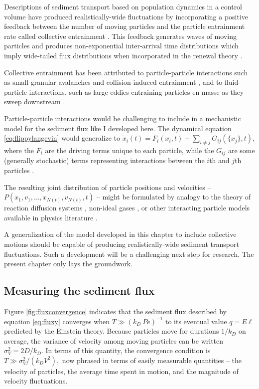 Descriptions of sediment transport based on population dynamics in a control volume have produced realistically-wide fluctuations by incorporating a positive feedback between the number of moving particles and the particle entrainment rate called collective entrainment \citep{Ancey2008,Ancey2014}.
This feedback generates waves of moving particles \citep{Ancey2014, Heyman2015} and produces non-exponential inter-arrival time distributions \citep{Heyman2013} which imply wide-tailed flux distributions when incorporated in the renewal theory \citep[e.g.][]{Turowski2010,Ancey2020}.

Collective entrainment has been attributed to particle-particle interactions such as small granular avalanches and collision-induced entrainment \citep[e.g.][]{Pahtz2020}, and to fluid-particle interactions, such as large eddies entraining particles en masse as they sweep downstream \citep{Ancey2014,Lee2018,Cameron2020}.

Particle-particle interactions would be challenging to include in a mechanistic model for the sediment flux like I developed here. 
The dynamical equation \ref{eq:flippylangevin} would generalize to $\dot{x}_i(t) = F_i(x_i,t) + \sum_{i\neq j}G_{ij}(\{x_j\},t)$, where the $F_i$ are the driving terms unique to each particle, while the $G_{ij}$ are some (generally stochastic) terms representing interactions between the $i$th and $j$th particles \citep{Goldstein1997}.

The resulting joint distribution of particle positions and velocities -- $P(x_1,v_1,\dots,x_{N(t)},v_{N(t)},t)$ -- might be formulated by analogy to the theory of reaction diffusion systems \citep{Pechenik1999, Cardy2008}, non-ideal gases \citep{Chapman1970,Brilliantov2004}, or other interacting particle models available in physics literature \citep{Hernandez2004,Escaff2018}.

A generalization of the model developed in this chapter to include collective motions should be capable of producing realistically-wide sediment transport fluctuations. Such a development will be a challenging next step for research. The present chapter only lays the groundwork.

\subsection{Measuring the sediment flux}

Figure \ref{fig:fluxconvergence} indicates that the sediment flux described by equation \ref{eq:fluxy} converges when $T\gg (k_D\ Pe)^{-1}$ to its eventual value $q = E\ell$ predicted by the Einstein theory.
Because particles move for durations $1/k_D$ on average, the variance of velocity among moving particles can be written $\sigma_V^2 = 2D/k_D$. In terms of this quantity, the convergence condition is  $T\gg \sigma_V^2/(k_D V^2),$ now phrased in terms of easily measurable quantities -- the velocity of particles, the average time spent in motion, and the magnitude of velocity fluctuations.

